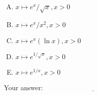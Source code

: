 \documentclass[10pt]{amsart}
\begin{document}
\begin{enumerate}
  \begin{enumerate}[(A)]
  \item $x \mapsto e^x/\sqrt{x}, x > 0$
  \item $x \mapsto e^x/x^2, x > 0$
  \item $x \mapsto e^x(\ln x), x > 0$
  \item $x \mapsto e^{1/\sqrt{x}}, x > 0$
  \item $x \mapsto e^{1/x}, x > 0$
  \end{enumerate}

  \vspace{0.1in}
  Your answer: $\underline{\qquad\qquad\qquad\qquad\qquad\qquad\qquad}$
  \vspace{0.6in}


\end{enumerate}
\end{document}
